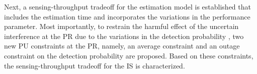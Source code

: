 Next, a sensing-throughput tradeoff for the estimation model is established that includes the estimation time and incorporates the variations in the performance parameter. Most importantly, to restrain the harmful effect of the uncertain interference at the PR due to the variations in the detection probability%
, two new PU constraints at the PR, namely, an average constraint and an outage constraint on the detection probability are proposed. Based on these constraints, the sensing-throughput tradeoff for the IS is characterized. 


